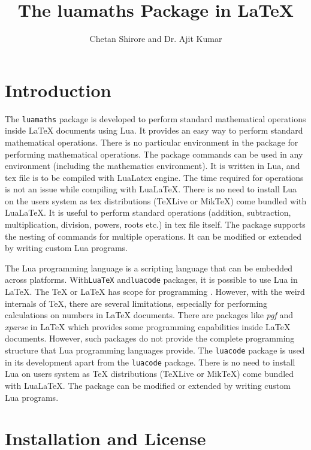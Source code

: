 \documentclass{article}
\begin{document}
\title{The luamaths Package in LaTeX}
\author{Chetan Shirore and Dr. Ajit Kumar}
\maketitle
\section{Introduction}\label{section:introduction}
The \verb|luamaths| package is developed to perform standard mathematical operations inside LaTeX documents using Lua. It provides an easy way to perform standard mathematical operations. There is no particular environment in the package for performing mathematical operations. The package commands can be used in any environment (including the mathematics environment). It is written in Lua, and tex file is to be compiled with LuaLatex engine. The time required for operations is not an issue while compiling with LuaLaTeX. There is no need to install Lua on the users system as tex distributions (TeXLive or MikTeX) come bundled with LuaLaTeX. It is useful to perform standard operations (addition, subtraction, multiplication, division, powers, roots etc.) in tex file itself. The package supports the nesting of commands for multiple operations. It can be modified or extended by writing custom Lua programs.

The Lua \cite{online.luaorg} programming language is a scripting language that can be embedded across platforms. With\verb|LuaTeX| \cite{online.luatex}  and\verb|luacode| \cite{online.luacode} packages, it is possible to use Lua in LaTeX. The TeX  \cite{online.tex} or LaTeX has scope for programming \cite{online.texscript}. However, with the weird internals of TeX, there are several limitations, especially for performing calculations on numbers in LaTeX documents. There are packages like \emph{pgf} \cite{online.pgf} and  \emph{xparse}  \cite{online.xparse} in LaTeX which provides some programming capabilities inside LaTeX documents. However, such packages do not provide the complete programming structure that Lua programming languages provide. The \verb|luacode| \cite{online.luacode}  package is used in its development apart from the \verb|luacode| package. There is no need to install Lua on users system as TeX distributions (TeXLive or MikTeX) come bundled with LuaLaTeX. The package can be modified or extended by writing custom Lua programs.


\section{Installation and License}
\end{document}
